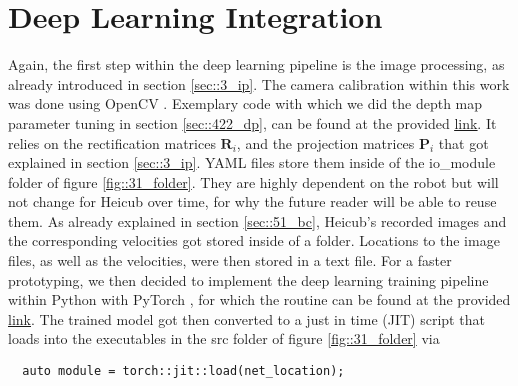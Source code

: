 \FloatBarrier
\section{Deep Learning Integration}
\label{sec::33_dl}
Again, the first step within the deep learning pipeline is the image processing, as already introduced in section  \ref{sec::3_ip}. The camera calibration within this work was done using OpenCV \cite{opencv_library}. Exemplary code with which we did the depth map parameter tuning in section \ref{sec::422_dp}, can be found at the provided \href{https://github.com/mhubii/nmpc_pattern_generator/blob/master/src/tune_disp_map.cpp}{\underline{link}}. It relies on the rectification matrices $\bm{R}_i$, and the projection matrices $\bm{P}_i$ that got explained in section \ref{sec::3_ip}. YAML files store them inside of the io\_module folder of figure \ref{fig::31_folder}. They are highly dependent on the robot but will not change for Heicub over time, for why the future reader will be able to reuse them. As already explained in section \ref{sec::51_bc}, Heicub's recorded images and the corresponding velocities got stored inside of a folder. Locations to the image files, as well as the velocities, were then stored in a text file. For a faster prototyping, we then decided to implement the deep learning training pipeline within Python with PyTorch \cite{paszke2017automatic}, for which the routine can be found at the provided \href{https://github.com/mhubii/nmpc_pattern_generator/blob/master/libs/learning/python/train_rgbd.py}{\underline{link}}. The trained model got then converted to a just in time (JIT) script that loads into the executables in the src folder of figure \ref{fig::31_folder} via
\begin{verbatim}
  auto module = torch::jit::load(net_location);
\end{verbatim}
